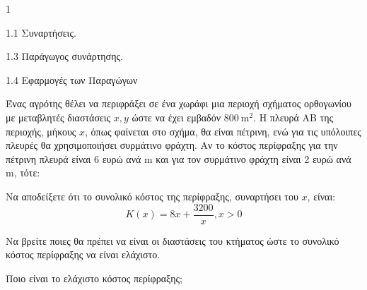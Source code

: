 \begin{ylh}{1}
    \item 1.1 Συναρτήσεις.
    \item 1.3 Παράγωγος συνάρτησης.
    \item 1.4 Εφαρμογές των Παραγώγων
\end{ylh}
\begin{center}
\end{center}
Ένας αγρότης θέλει να περιφράξει σε ένα χωράφι μια περιοχή σχήματος ορθογωνίου με μεταβλητές διαστάσεις $x, y$ ώστε να έχει εμβαδόν $800\ \text{m}^2$. Η πλευρά ΑΒ της περιοχής, μήκους $x$, όπως φαίνεται στο σχήμα, θα είναι πέτρινη, ενώ για τις υπόλοιπες πλευρές θα χρησιμοποιήσει συρμάτινο φράχτη. Αν το κόστος περίφραξης για την πέτρινη πλευρά είναι 6 ευρώ ανά m και για τον συρμάτινο φράχτη είναι 2 ευρώ ανά m, τότε:
\begin{alist}
    \item Να αποδείξετε ότι το συνολικό κόστος της περίφραξης, συναρτήσει του $x$, είναι:
    \[ K(x) = 8x + \frac{3200}{x}, x > 0 \]
    
    \item Να βρείτε ποιες θα πρέπει να είναι οι διαστάσεις του κτήματος ώστε το συνολικό κόστος περίφραξης να είναι ελάχιστο.
    
    \item Ποιο είναι το ελάχιστο κόστος περίφραξης;
\end{alist}


